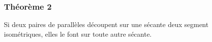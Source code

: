 \documentclass[a4paper,12pt]{article}
\begin{document}
\pagebreak
\subsubsection{Théorème 2}
\begin{theorem}
Si deux paires de parallèles découpent sur une sécante deux segment isométriques, elles le font sur toute autre sécante.
\end{theorem}
\end{document}
